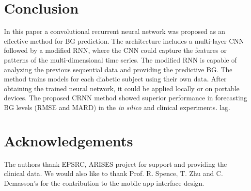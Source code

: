 \documentclass[a4paper, 10 pt, twocolumn]{IEEEtran}
\begin{document}
\section{Conclusion}
In this paper a convolutional recurrent neural network was proposed as an effective method for BG prediction. The architecture includes a multi-layer CNN followed by a modified RNN, where the CNN could capture the
features or patterns of the multi-dimensional time series. The modified RNN is capable of analyzing the previous sequential data and providing the predictive BG. The method trains models for each diabetic subject using
their own data.
After obtaining the trained neural network, it could be applied locally or on portable devices. The proposed CRNN method showed superior performance in forecasting BG levels (RMSE and MARD) in the \emph{in silico} and
clinical experiments.
lag.




\section{Acknowledgements}

The authors thank EPSRC, ARISES project for support and providing the clinical data. We would also like to thank Prof. R. Spence, T. Zhu and C. Demasson's for the contribution to the mobile app interface design. 
\end{document}
